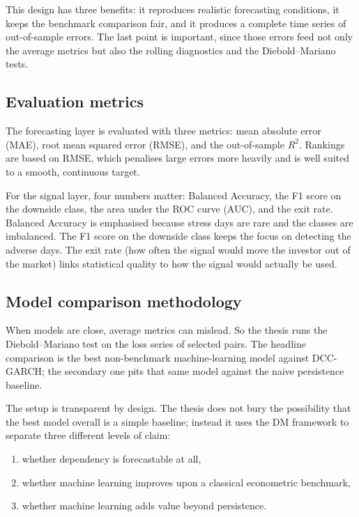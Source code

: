 This design has three benefits: it reproduces realistic forecasting conditions, it keeps the benchmark comparison fair, and it produces a complete time series of out-of-sample errors. The last point is important, since those errors feed not only the average metrics but also the rolling diagnostics and the Diebold--Mariano tests.

\subsection{Evaluation metrics}

The forecasting layer is evaluated with three metrics: mean absolute error (MAE), root mean squared error (RMSE), and the out-of-sample $R^2$. Rankings are based on RMSE, which penalises large errors more heavily and is well suited to a smooth, continuous target.

For the signal layer, four numbers matter: Balanced Accuracy, the F1 score on the downside class, the area under the ROC curve (AUC), and the exit rate. Balanced Accuracy is emphasised because stress days are rare and the classes are imbalanced. The F1 score on the downside class keeps the focus on detecting the adverse days. The exit rate (how often the signal would move the investor out of the market) links statistical quality to how the signal would actually be used.

\subsection{Model comparison methodology}

When models are close, average metrics can mislead. So the thesis runs the Diebold--Mariano test on the loss series of selected pairs. The headline comparison is the best non-benchmark machine-learning model against DCC-GARCH; the secondary one pits that same model against the naive persistence baseline.

The setup is transparent by design. The thesis does not bury the possibility that the best model overall is a simple baseline; instead it uses the DM framework to separate three different levels of claim:

\begin{enumerate}
    \item whether dependency is forecastable at all,
    \item whether machine learning improves upon a classical econometric benchmark,
    \item whether machine learning adds value beyond persistence.
\end{enumerate}

